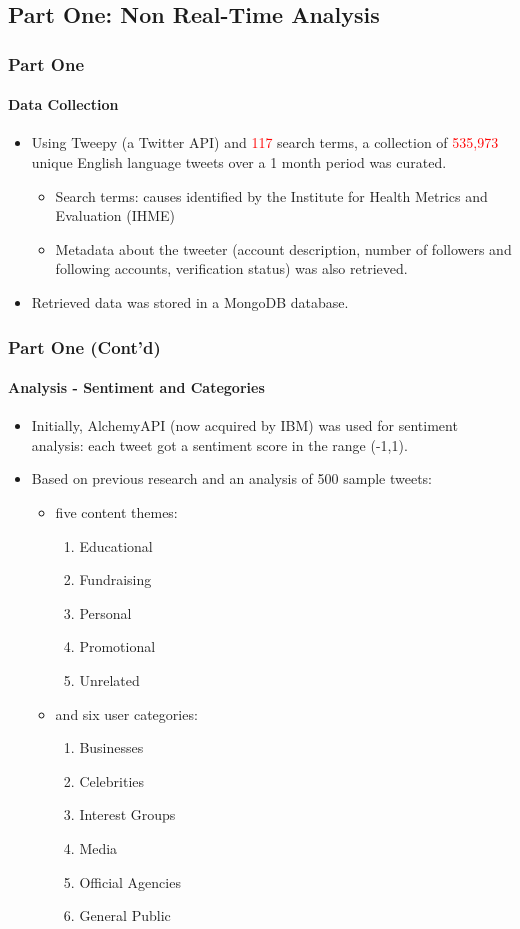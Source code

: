 \documentclass[11pt]{beamer}
\begin{document}
\subsection{Part One: Non Real-Time Analysis}
\begin{frame}
\frametitle{Part One}
\framesubtitle{Data Collection}
\begin{itemize}
	\item<1-> Using Tweepy (a Twitter API) and \textcolor{red}{117} search terms, a collection of \textcolor{red}{535,973} unique English language tweets over a 1 month period was curated.
	\begin{itemize}
		\item<2-> Search terms: causes identified by the Institute for Health Metrics and Evaluation (IHME)
		\item<3-> Metadata about the tweeter (account description, number of followers and following accounts, verification status) was also retrieved.
	\end{itemize}
	\item<4-> Retrieved data was stored in a MongoDB database.
\end{itemize}
\end{frame}

\begin{frame}
\frametitle{Part One (Cont'd)}
\framesubtitle{Analysis - Sentiment and Categories}
\begin{itemize}
	\item<1-> Initially, AlchemyAPI (now acquired by IBM) was used for sentiment analysis: each tweet got a sentiment score in the range (-1,1).
	\item<2-> Based on previous research and an analysis of 500 sample tweets:
	\begin{itemize}
		\item five content themes:
		\begin{enumerate}
			\item Educational
			\item Fundraising
			\item Personal
			\item Promotional
			\item Unrelated
		\end{enumerate}
		\item<3-> and six user categories:
		\begin{enumerate}
			\item Businesses
			\item Celebrities
			\item Interest Groups
			\item Media
			\item Official Agencies
			\item General Public
		\end{enumerate}
	\end{itemize}
\end{itemize}
\end{frame}
\end{document}
